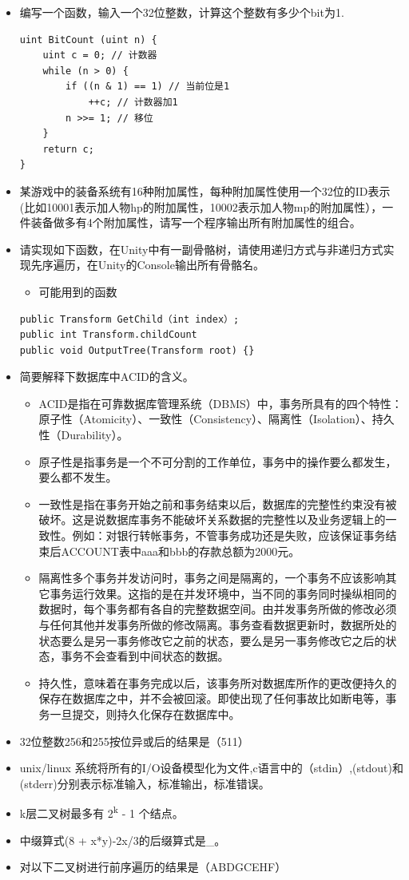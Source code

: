 \documentclass[9pt, b5paper]{article}
\begin{document}
\begin{itemize}
\begin{itemize}
\end{itemize}
\item 编写一个函数，输入一个32位整数，计算这个整数有多少个bit为1.
\begin{verbatim}
uint BitCount (uint n) {
    uint c = 0; // 计数器
    while (n > 0) {
        if ((n & 1) == 1) // 当前位是1
            ++c; // 计数器加1
        n >>= 1; // 移位
    }
    return c;
}
\end{verbatim}
\item 某游戏中的装备系统有16种附加属性，每种附加属性使用一个32位的ID表示(比如10001表示加人物hp的附加属性，10002表示加人物mp的附加属性），一件装备做多有4个附加属性，请写一个程序输出所有附加属性的组合。
\item 请实现如下函数，在Unity中有一副骨骼树，请使用递归方式与非递归方式实现先序遍历，在Unity的Console输出所有骨骼名。
\begin{itemize}
\item 可能用到的函数
\end{itemize}
\begin{verbatim}
public Transform GetChild（int index）;
public int Transform.childCount
public void OutputTree(Transform root) {}
\end{verbatim}
\item 简要解释下数据库中ACID的含义。
\begin{itemize}
\item ACID是指在可靠数据库管理系统（DBMS）中，事务所具有的四个特性：原子性（Atomicity）、一致性（Consistency）、隔离性（Isolation）、持久性（Durability）。
\item 原子性是指事务是一个不可分割的工作单位，事务中的操作要么都发生，要么都不发生。
\item 一致性是指在事务开始之前和事务结束以后，数据库的完整性约束没有被破坏。这是说数据库事务不能破坏关系数据的完整性以及业务逻辑上的一致性。例如：对银行转帐事务，不管事务成功还是失败，应该保证事务结束后ACCOUNT表中aaa和bbb的存款总额为2000元。
\item 隔离性多个事务并发访问时，事务之间是隔离的，一个事务不应该影响其它事务运行效果。这指的是在并发环境中，当不同的事务同时操纵相同的数据时，每个事务都有各自的完整数据空间。由并发事务所做的修改必须与任何其他并发事务所做的修改隔离。事务查看数据更新时，数据所处的状态要么是另一事务修改它之前的状态，要么是另一事务修改它之后的状态，事务不会查看到中间状态的数据。
\item 持久性，意味着在事务完成以后，该事务所对数据库所作的更改便持久的保存在数据库之中，并不会被回滚。即使出现了任何事故比如断电等，事务一旦提交，则持久化保存在数据库中。
\end{itemize}
\item 32位整数256和255按位异或后的结果是（511）
\item unix/linux 系统将所有的I/O设备模型化为文件,c语言中的（stdin）,(stdout)和(stderr)分别表示标准输入，标准输出，标准错误。
\item k层二叉树最多有 2\textsuperscript{k} - 1 个结点。
\item 中缀算式(8 + x*y)-2x/3的后缀算式是\_。
\item 对以下二叉树进行前序遍历的结果是（ABDGCEHF）


\end{itemize}
\end{document}
